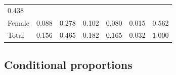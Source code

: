 \documentclass[11pt,a4paper,openany]{book}
\begin{document}
\begin{longtable}[]{@{}lcccccc@{}}
\begin{minipage}[t]{0.07\columnwidth}
0.438\strut
\end{minipage}\tabularnewline
\begin{minipage}[t]{0.14\columnwidth}\raggedright\strut
Female\strut
\end{minipage} & \begin{minipage}[t]{0.15\columnwidth}\centering\strut
0.088\strut
\end{minipage} & \begin{minipage}[t]{0.08\columnwidth}\centering\strut
0.278\strut
\end{minipage} & \begin{minipage}[t]{0.15\columnwidth}\centering\strut
0.102\strut
\end{minipage} & \begin{minipage}[t]{0.10\columnwidth}\centering\strut
0.080\strut
\end{minipage} & \begin{minipage}[t]{0.10\columnwidth}\centering\strut
0.015\strut
\end{minipage} & \begin{minipage}[t]{0.07\columnwidth}\centering\strut
0.562\strut
\end{minipage}\tabularnewline
\begin{minipage}[t]{0.14\columnwidth}\raggedright\strut
Total\strut
\end{minipage} & \begin{minipage}[t]{0.15\columnwidth}\centering\strut
0.156\strut
\end{minipage} & \begin{minipage}[t]{0.08\columnwidth}\centering\strut
0.465\strut
\end{minipage} & \begin{minipage}[t]{0.15\columnwidth}\centering\strut
0.182\strut
\end{minipage} & \begin{minipage}[t]{0.10\columnwidth}\centering\strut
0.165\strut
\end{minipage} & \begin{minipage}[t]{0.10\columnwidth}\centering\strut
0.032\strut
\end{minipage} & \begin{minipage}[t]{0.07\columnwidth}\centering\strut
1.000\strut
\end{minipage}\tabularnewline
\bottomrule
\end{longtable}

\subsection{Conditional proportions}\label{ss-descr1-2cat-cond}
\end{document}
